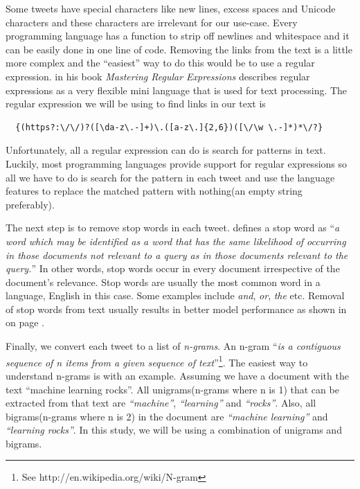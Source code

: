 Some tweets have special characters like new lines, excess spaces and Unicode characters and these
characters are irrelevant for our use-case. Every programming language has a function to strip
off newlines and whitespace and it can be easily done in one line of code. Removing the links from
the text is a little more complex and the ``easiest'' way to do this would be to use a regular
expression. \citet{friedl2006mastering} in his book \textit{Mastering Regular Expressions} describes
regular expressions as a very flexible mini language that is used for text processing. The regular
expression we will be using to find links in our text is
\begin{verbatim}
  {(https?:\/\/)?([\da-z\.-]+)\.([a-z\.]{2,6})([\/\w \.-]*)*\/?}
\end{verbatim}

Unfortunately, all a regular expression can do is search for patterns in text. Luckily, most
programming languages provide support for regular expressions so all we have to do is search for the
pattern in each tweet and use the language features to replace the matched pattern with nothing(an
empty string preferably).

The next step is to remove stop words in each tweet. \citet{wilbur1992automatic} defines a stop word
as ``\textit{a word which may be identified as a word that has the same likelihood of occurring in
those documents not relevant to a query as in those documents relevant to the query.}'' In other
words, stop words occur in every document irrespective of the document's relevance. Stop words are
usually the most common word in a language, English in this case. Some examples include
\textit{and}, \textit{or}, \textit{the} etc. Removal of stop words from text usually results in
better model performance as shown in  on page
\pageref{fig:auc_curves_stopwords}.


Finally, we convert each tweet to a list of \textit{n-grams}. An n-gram ``\textit{is a contiguous
sequence of n items from a given sequence of text}''\footnote{See
http://en.wikipedia.org/wiki/N-gram}. The easiest way to understand n-grams is with an example.
Assuming we have a document with the text ``machine learning rocks''. All unigrams(n-grams
where n is 1) that can be extracted from that text are \textit{``machine''}, \textit{``learning''}
and \textit{``rocks''}. Also, all bigrams(n-grams where n is 2) in the document are
\textit{``machine learning''} and \textit{``learning rocks''}. In this study, we will be using a
combination of unigrams and bigrams.

